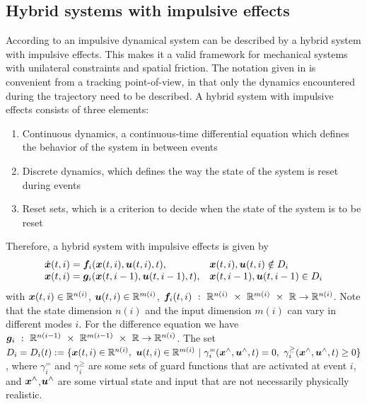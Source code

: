 \documentclass[../DC2017114Bouma.tex]{subfiles}
\begin{document}
%
\subsection{Hybrid systems with impulsive effects}\label{sec:2hyb}
According to \cite{Haddad2006} an impulsive dynamical system can be described by a hybrid system with impulsive effects. This makes it a valid framework for mechanical systems with unilateral constraints and spatial friction. The notation given in \cite{Haddad2006} is convenient from a tracking point-of-view, in that only the dynamics encountered during the trajectory need to be described. A hybrid system with impulsive effects consists of three elements:
\begin{enumerate}
\item Continuous dynamics, a continuous-time differential equation which defines the behavior of the system in between events
\item Discrete dynamics, which defines the way the state of the system is reset during events
\item Reset sets, which is a criterion to decide when the state of the system is to be reset
\end{enumerate}

Therefore, a hybrid system with impulsive effects is given by
\begin{equation}
\begin{array}{ll}
\dot{{\boldsymbol{x}}}(t,i) ={\boldsymbol{f}}_i({\boldsymbol{x}}(t,i),{\boldsymbol{u}}(t,i),t),& {\boldsymbol{x}}(t,i),{\boldsymbol{u}}(t,i)\notin D_i\\
{\boldsymbol{x}}(t,i) = {\boldsymbol{g}}_i({\boldsymbol{x}}(t,i-1),{\boldsymbol{u}}(t,i-1),t),& {\boldsymbol{x}}(t,i-1),{\boldsymbol{u}}(t,i-1)\in D_i
\end{array}\label{eq:hybimp}
\end{equation}
%
%
%
%
%
%
%
with ${\boldsymbol{x}}(t,i)\in\mathbb{R}^{n(i)}$, ${\boldsymbol{u}}(t,i)\in\mathbb{R}^{m(i)}$, $\fb_i(t,i)\ :\ \Rbb^{n(i)}\ \times\ \Rbb^{m(i)}\ \times\ \Rbb\rightarrow \Rbb^{n(i)}$. Note that the state dimension $n(i)$ and the input dimension $m(i)$ can vary in different modes $i$. For the difference equation we have $\gb_i\ :\ \Rbb^{n(i-1)}\ \times\ \Rbb^{m(i-1)}\ \times\ \Rbb\rightarrow \Rbb^{n(i)}$. The set $D_i = D_i(t) := \{\xb(t,i)\in\Rbb^{n(i)},\ \ub(t,i)\in\Rbb^{m(i)}\ |\ \gamma^{=}_i(\xb^{\wedge},\ub^{\wedge},t) = 0, \ \gamma^{\geq}_i(\xb^{\wedge},\ub^{\wedge},t) \geq 0\}$, where $\gamma^{=}_i$ and $\gamma^{\geq}_i$ are some sets of guard functions that are activated at event $i$, and ${\boldsymbol{x}}^{\wedge}$,${\boldsymbol{u}}^{\wedge}$ are some virtual state and input that are not necessarily physically realistic.
\end{document}
